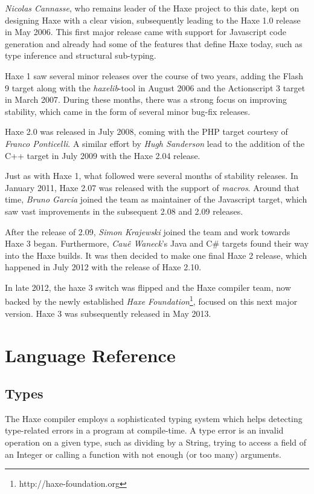 \documentclass[a4paper,oneside]{book}
\newcommand{\target}[1]{#1}
\begin{document}
\emph{Nicolas Cannasse}, who remains leader of the Haxe project to this date, kept on designing Haxe with a clear vision, subsequently leading to the Haxe 1.0 release in May 2006. This first major release came with support for \target{Javascript} code generation and already had some of the features that define Haxe today, such as type inference and structural sub-typing.

Haxe 1 saw several minor releases over the course of two years, adding the \target{Flash 9} target along with the \emph{haxelib}-tool in August 2006 and the \target{Actionscript 3} target in March 2007. During these months, there was a strong focus on improving stability, which came in the form of several minor bug-fix releases.

Haxe 2.0 was released in July 2008, coming with the \target{PHP} target courtesy of \emph{Franco Ponticelli}. A similar effort by \emph{Hugh Sanderson} lead to the addition of the \target{C++} target in July 2009 with the Haxe 2.04 release.

Just as with Haxe 1, what followed were several months of stability releases. In January 2011, Haxe 2.07 was released with the support of \emph{macros}. Around that time, \emph{Bruno Garcia} joined the team as maintainer of the \target{Javascript} target, which saw vast improvements in the subsequent 2.08 and 2.09 releases.

After the release of 2.09, \emph{Simon Krajewski} joined the team and work towards Haxe 3 began. Furthermore, \emph{Cau\^{e} Waneck}'s \target{Java} and \target{C\#} targets found their way into the Haxe builds. It was then decided to make one final Haxe 2 release, which happened in July 2012 with the release of Haxe 2.10.

In late 2012, the haxe 3 switch was flipped and the Haxe compiler team, now backed by the newly established \emph{Haxe Foundation}\footnote{http://haxe-foundation.org}, focused on this next major version. Haxe 3 was subsequently released in May 2013.

\part{Language Reference}

\chapter{Types}
\label{types}

The Haxe compiler employs a sophisticated typing system which helps detecting type-related errors in a program at compile-time. A type error is an invalid operation on a given type, such as dividing by a String, trying to access a field of an Integer or calling a function with not enough (or too many) arguments.
\end{document}
